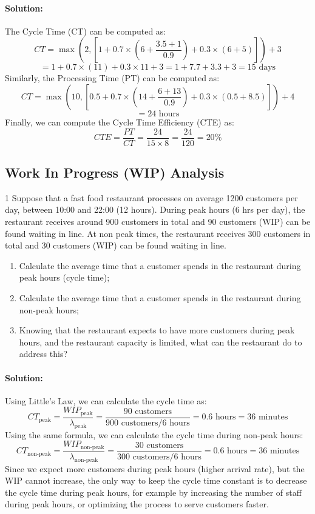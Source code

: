 \paragraph{Solution:}
The Cycle Time (CT) can be computed as:
\[CT = \max\left(2, \left[1 + 0.7 \times \left(6 + \frac{3.5 + 1}{0.9} \right) + 0.3 \times \left(6 + 5 \right) \right] \right) + 3\]  
\[ = 1 + 0.7 \times (11) + 0.3 \times 11 + 3 = 1 + 7.7 + 3.3 + 3 = 15 \text{ days}\]
Similarly, the Processing Time (PT) can be computed as:
\[CT = \max\left(10, \left[0.5 + 0.7 \times \left(14 + \frac{6 + 13}{0.9} \right) + 0.3 \times \left(0.5 + 8.5 \right) \right] \right) + 4\]
\[ = 24 \text{ hours}\]
Finally, we can compute the Cycle Time Efficiency (CTE) as:
\[CTE = \frac{PT}{CT} = \frac{24}{15 \times 8} = \frac{24}{120} = 20\%\]  

\subsection{Work In Progress (WIP) Analysis}
\begin{exercise}{1}
Suppose that a fast food restaurant processes on average 1200 customers per day, between 10:00 and 22:00 (12 hours).
During peak hours (6 hrs per day), the restaurant receives around 900 customers in total and 90 customers (WIP) can be found waiting in line.
At non peak times, the restaurant receives 300 customers in total and 30 customers (WIP) can be found waiting in line.
\begin{enumerate}
    \item Calculate the average time that a customer spends in the restaurant during peak hours (cycle time);
    \item Calculate the average time that a customer spends in the restaurant during non-peak hours;
    \item Knowing that the restaurant expects to have more customers during peak hours, and the restaurant capacity is limited, what can the restaurant do to address this?
\end{enumerate}
\end{exercise}
\paragraph{Solution:}
Using Little's Law, we can calculate the cycle time as:
\begin{equation*}
    CT_{\text{peak}} = \frac{WIP_{\text{peak}}}{\lambda_{\text{peak}}} = \frac{90 \text{ customers}}{900 \text{ customers} / 6 \text{ hours}} = 0.6 \text{ hours} = 36 \text{ minutes}
\end{equation*}
Using the same formula, we can calculate the cycle time during non-peak hours:
\begin{equation*}
    CT_{\text{non-peak}} = \frac{WIP_{\text{non-peak}}}{\lambda_{\text{non-peak}}} = \frac{30 \text{ customers}}{300 \text{ customers} / 6 \text{ hours}} = 0.6 \text{ hours} = 36 \text{ minutes}
\end{equation*}
Since we expect more customers during peak hours (higher arrival rate), but the WIP cannot increase, the only way to keep the cycle time constant
is to decrease the cycle time during peak hours, for example by increasing the number of staff during peak hours, or optimizing the process to serve customers faster.